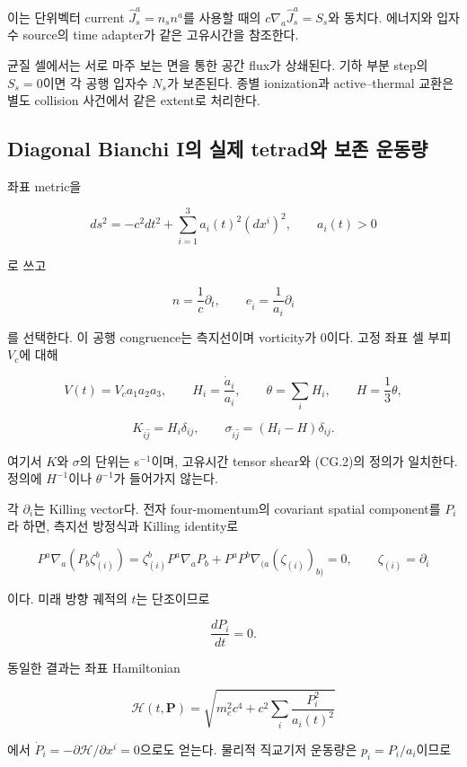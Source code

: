 \documentclass[11pt,a4paper]{article}
\begin{document}
이는 단위벡터 current \(\widehat J_s^a=n_s n^a\)를 사용할 때의 \(c\nabla_a\widehat J_s^a=S_s\)와 동치다. 에너지와 입자수 source의 time adapter가 같은 고유시간을 참조한다.

균질 셀에서는 서로 마주 보는 면을 통한 공간 flux가 상쇄된다. 기하 부분 step의 \(S_s=0\)이면 각 공행 입자수 \(N_s\)가 보존된다. 종별 ionization과 active--thermal 교환은 별도 collision 사건에서 같은 extent로 처리한다.

\hypertarget{diagonal-bianchi-iuxc758-uxc2e4uxc81c-tetraduxc640-uxbcf4uxc874-uxc6b4uxb3d9uxb7c9}{%
\subsection{Diagonal Bianchi I의 실제 tetrad와 보존 운동량}\label{diagonal-bianchi-iuxc758-uxc2e4uxc81c-tetraduxc640-uxbcf4uxc874-uxc6b4uxb3d9uxb7c9}}

좌표 metric을

\[
ds^2=-c^2dt^2+\sum_{i=1}^3a_i(t)^2(dx^i)^2,\qquad a_i(t)>0
\tag{CG.4}
\]

로 쓰고

\[
n=\frac1c\partial_t,\qquad
e_{\hat i}=\frac1{a_i}\partial_i
\]

를 선택한다. 이 공행 congruence는 측지선이며 vorticity가 0이다. 고정 좌표 셀 부피 \(V_c\)에 대해

\[
V(t)=V_c a_1a_2a_3,\qquad
H_i=\frac{\dot a_i}{a_i},\qquad
\theta=\sum_iH_i,\qquad H=\frac13\theta,
\]

\[
K_{\hat i\hat j}=H_i\delta_{ij},\qquad
\sigma_{\hat i\hat j}=(H_i-H)\delta_{ij}.
\]

여기서 \(K\)와 \(\sigma\)의 단위는 s\(^{-1}\)이며, 고유시간 tensor shear와 (CG.2)의 정의가 일치한다. 정의에 \(H^{-1}\)이나 \(\theta^{-1}\)가 들어가지 않는다.

각 \(\partial_i\)는 Killing vector다. 전자 four-momentum의 covariant spatial component를 \(P_i\)라 하면, 측지선 방정식과 Killing identity로

\[
P^a\nabla_a(P_b\zeta_{(i)}^b)
=\zeta_{(i)}^bP^a\nabla_aP_b
+P^aP^b\nabla_{(a}(\zeta_{(i)})_{b)}=0,
\qquad \zeta_{(i)}=\partial_i
\]

이다. 미래 방향 궤적의 \(t\)는 단조이므로

\[
\frac{dP_i}{dt}=0.
\]

동일한 결과는 좌표 Hamiltonian

\[
\mathcal H(t,\boldsymbol P)
=\sqrt{m_e^2c^4+c^2\sum_i\frac{P_i^2}{a_i(t)^2}}
\]

에서 \(\dot P_i=-\partial\mathcal H/\partial x^i=0\)으로도 얻는다. 물리적 직교기저 운동량은 \(p_{\hat i}=P_i/a_i\)이므로
\end{document}
